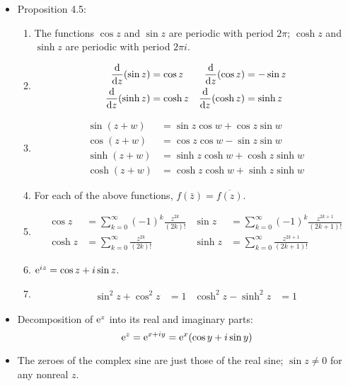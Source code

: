 \documentclass[../notes.tex]{subfiles}
\begin{document}
\begin{itemize}
    \item Proposition 4.5:
    \begin{enumerate}[label={\roman*.}]
        \item The functions $\cos z$ and $\sin z$ are periodic with period $2\pi$; $\cosh z$ and $\sinh z$ are periodic with period $2\pi i$.
        \item 
        \begin{align*}
            \dv{z}(\sin z) &= \cos z&
                \dv{z}(\cos z) &= -\sin z\\
            \dv{z}(\sinh z) &= \cosh z&
                \dv{z}(\cosh z) &= \sinh z
        \end{align*}
        \item 
        \begin{align*}
            \sin(z+w) &= \sin z\cos w+\cos z\sin w\\
            \cos(z+w) &= \cos z\cos w-\sin z\sin w\\
            \sinh(z+w) &= \sinh z\cosh w+\cosh z\sinh w\\
            \cosh(z+w) &= \cosh z\cosh w+\sinh z\sinh w
        \end{align*}
        \item For each of the above functions, $f(\bar{z})=\overline{f(z)}$.
        \item 
        \begin{align*}
            \cos z &= \sum_{k=0}^\infty(-1)^k\frac{z^{2k}}{(2k)!}&
                \sin z &= \sum_{k=0}^\infty(-1)^k\frac{z^{2k+1}}{(2k+1)!}\\
            \cosh z &= \sum_{k=0}^\infty\frac{z^{2k}}{(2k)!}&
                \sinh z &= \sum_{k=0}^\infty\frac{z^{2k+1}}{(2k+1)!}
        \end{align*}
        \item $\e[iz]=\cos z+i\sin z$.
        \item 
        \begin{align*}
            \sin^2z+\cos^2z &= 1&
            \cosh^2z-\sinh^2z &= 1
        \end{align*}
    \end{enumerate}
    \item Decomposition of $\e[z]$ into its real and imaginary parts:
    \begin{equation*}
        \e[z] = \e[x+iy] = \e[x](\cos y+i\sin y)
    \end{equation*}
    \item The zeroes of the complex sine are just those of the real sine; $\sin z\neq 0$ for any nonreal $z$.

\end{itemize}
\end{document}
